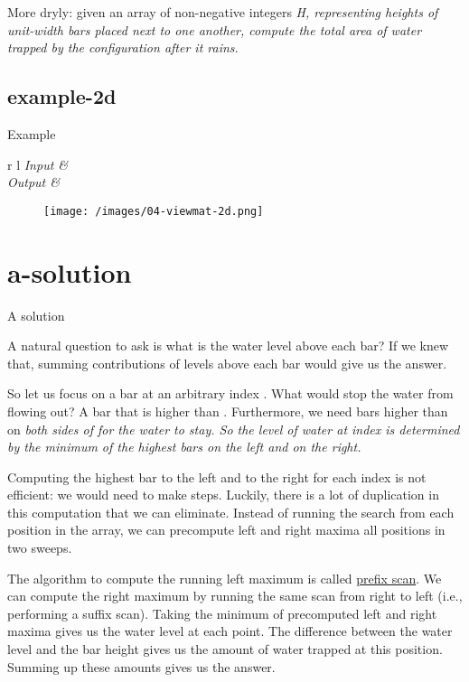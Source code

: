 \documentclass{article}
\begin{document}
More dryly: given an array of non-negative integers \em{H}, representing heights of unit-width bars placed next to one another, compute the total area of water trapped by the configuration after it rains.

\subsection{example-2d}{Example}
\begin{tabular*}{r l}
    \em{Input} &  \\
    \em{Output} &  \\
\end{tabular*}

\newline

\begin{figure}
  \texttt{[image: /images/04-viewmat-2d.png]}
\end{figure}

\section{a-solution}{A solution}

A natural question to ask is what is the water level above each bar?
If we knew that, summing contributions of levels above each bar would give us the answer.

So let us focus on a bar at an arbitrary index .
What would stop the water from flowing out?
A bar that is higher than .
Furthermore, we need bars higher than  on \em{both} sides of  for the water to stay.
So the level of water at index  is determined by the minimum of the highest bars on the left and on the right.

Computing the highest bar to the left and to the right for each index is not efficient: we would need to make  steps.
Luckily, there is a lot of duplication in this computation that we can eliminate.
Instead of running the search from each position in the array, we can precompute left and right maxima all positions in two sweeps.

The algorithm to compute the running left maximum is called \href{https://en.wikipedia.org/wiki/Prefix_sum}{prefix scan}.
We can compute the right maximum by running the same scan from right to left (i.e., performing a suffix scan).
Taking the minimum of precomputed left and right maxima gives us the water level at each point.
The difference between the water level and the bar height gives us the amount of water trapped at this position.
Summing up these amounts gives us the answer.
\end{document}
